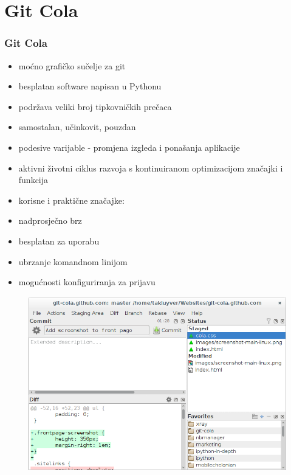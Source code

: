 \section{Git Cola}
\begin{frame}[allowframebreaks]
\frametitle{Git Cola}
 
\begin{itemize}
 \item moćno grafičko sučelje za git
 \item besplatan software napisan u Pythonu
 \item podržava veliki broj tipkovničkih prečaca
 \item samostalan, učinkovit, pouzdan
 \item podesive varijable - promjena izgleda i ponašanja aplikacije
 \item aktivni životni ciklus razvoja s kontinuiranom optimizacijom značajki i funkcija
 \framebreak
 \item korisne i praktične značajke:
 		\item nadprosječno brz
 		\item besplatan za uporabu
 		\item ubrzanje komandnom linijom
 		\item mogućnosti konfiguriranja za prijavu
\end{itemize}


\begin{figure}
	\includegraphics[width=0.9\linewidth]{images/git-cola.png}
\end{figure}
\end{frame}
